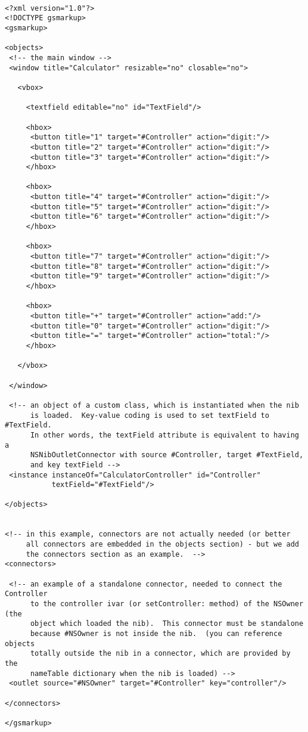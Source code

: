 \begin{verbatim}

<?xml version="1.0"?>
<!DOCTYPE gsmarkup>
<gsmarkup>

<objects>
 <!-- the main window -->
 <window title="Calculator" resizable="no" closable="no">

   <vbox>

     <textfield editable="no" id="TextField"/>

     <hbox>
      <button title="1" target="#Controller" action="digit:"/>
      <button title="2" target="#Controller" action="digit:"/>
      <button title="3" target="#Controller" action="digit:"/>
     </hbox>

     <hbox>
      <button title="4" target="#Controller" action="digit:"/>
      <button title="5" target="#Controller" action="digit:"/>
      <button title="6" target="#Controller" action="digit:"/>
     </hbox>

     <hbox>
      <button title="7" target="#Controller" action="digit:"/>
      <button title="8" target="#Controller" action="digit:"/>
      <button title="9" target="#Controller" action="digit:"/>
     </hbox>

     <hbox>
      <button title="+" target="#Controller" action="add:"/>
      <button title="0" target="#Controller" action="digit:"/>
      <button title="=" target="#Controller" action="total:"/>
     </hbox>

   </vbox>

 </window>

 <!-- an object of a custom class, which is instantiated when the nib
      is loaded.  Key-value coding is used to set textField to #TextField.
      In other words, the textField attribute is equivalent to having a
      NSNibOutletConnector with source #Controller, target #TextField, 
      and key textField -->
 <instance instanceOf="CalculatorController" id="Controller" 
           textField="#TextField"/>

</objects>


<!-- in this example, connectors are not actually needed (or better
     all connectors are embedded in the objects section) - but we add
     the connectors section as an example.  -->
<connectors>

 <!-- an example of a standalone connector, needed to connect the Controller
      to the controller ivar (or setController: method) of the NSOwner (the
      object which loaded the nib).  This connector must be standalone
      because #NSOwner is not inside the nib.  (you can reference objects
      totally outside the nib in a connector, which are provided by the
      nameTable dictionary when the nib is loaded) -->
 <outlet source="#NSOwner" target="#Controller" key="controller"/>

</connectors>

</gsmarkup>
\end{verbatim}
